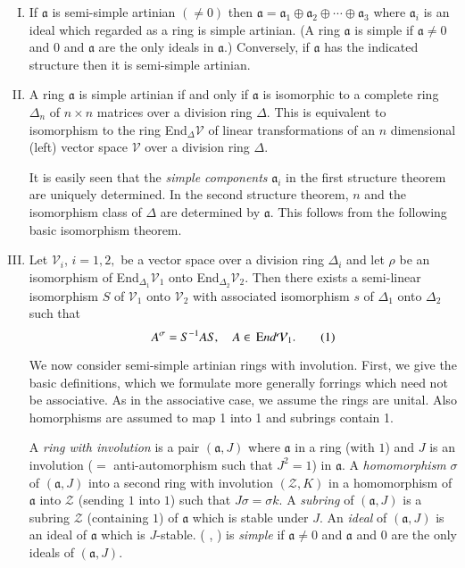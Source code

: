 \begin{enumerate}[I.]
\item  If $\mathfrak{a}$ is semi-simple artinian $(\neq 0)$ then
$\mathfrak{a}=\mathfrak{a}_1\oplus\mathfrak{a}_2\oplus\cdots\oplus\mathfrak{a}_3$ 
where $\mathfrak{a}_i$ is an ideal which regarded as a ring is simple
artinian. (A ring $\mathfrak{a}$ is simple if $\mathfrak{a}\neq 0$ and
$0$ and $\mathfrak{a}$ are the only ideals in $\mathfrak{a}$.)
Conversely, if $\mathfrak{a}$ has the indicated structure then it is
semi-simple artinian. 

\item A ring $\mathfrak{a}$ is simple artinian if and only if
$\mathfrak{a}$ is isomorphic to a complete ring $\Delta_n$ of $n\times
n$ matrices over a division ring $\Delta$. This is equivalent to
isomorphism to the ring End$_{\Delta}\mathcal{V}$ of linear
transformations of an $n$ dimensional (left) vector space
$\mathcal{V}$ over a division ring $\Delta$. 

It is easily seen that the {\em simple components} $\mathfrak{a}_i$ in
the first structure theorem are uniquely determined. In the second
structure theorem, $n$ and the isomorphism class of $\Delta$ are
determined by $\mathfrak{a}$. This follows from the following basic
isomorphism theorem. 

\item Let $\mathcal{V}_i$, $i=1,2,$ be a vector space over a division
ring $\Delta_i$ and let $\rho$ be an isomorphism of
End$_{\Delta_{1}}\mathcal{V}_1$ onto
End$_{\Delta_{2}}\mathcal{V}_2$. Then there exists a semi-linear
isomorphism $S$ of $\mathcal{V}_1$ onto $\mathcal{V}_2$ with
associated isomorphism $s$ of $\Delta_1$ onto $\Delta_2$ such that 
\begin{equation*}
A^{\sigma}=S^{-1} AS,\quad A\in \, {\text
End} \mathcal{V}_1.\tag{1}\label{c0:eq1} 
\end{equation*}

We now consider semi-simple artinian rings with involution. First, we
give the basic definitions, which we formulate more generally
for\pageoriginale rings which need not be associative. As in the
associative case, we assume the rings are unital. Also homorphisms are
assumed to map 1 into 1 and subrings contain 1. 


\begin{definition}
A {\em ring with involution} is a pair $(\mathfrak{a},J)$ where
$\mathfrak{a}$ in a ring (with $1$) and $J$ is an involution ($=$
anti-automorphism such that $J^{2}=1$) in $\mathfrak{a}$. A {\em
homomorphism} $\sigma$ of $(\mathfrak{a}, J)$ into a second ring with
involution $(\mathscr{Z}, K)$ in a homomorphism of $\mathfrak{a}$ into
$\mathscr{Z}$ (sending $1$ into $1$) such that $J\sigma =\sigma k$. A
{\em subring} of $(\mathfrak{a}, J)$ is a subring $\mathscr{Z}$
(containing $1$) of $\mathfrak{a}$ which is stable under $J$. An {\em
ideal} of $(\mathfrak{a}, J)$ is an ideal of $\mathfrak{a}$ which is
$J$-stable. ( , ) is {\em simple} if $\mathfrak{a}\neq 0$ and $\mathfrak{a}$ and $0$ are the only ideals of $(\mathfrak{a}, J)$. 
\end{definition}


\end{enumerate}
